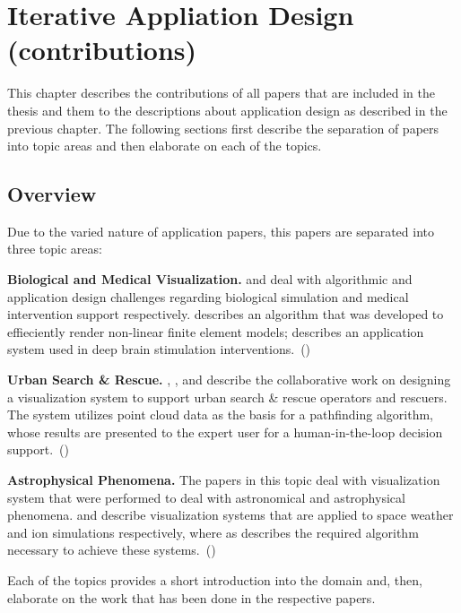 \chapter{Iterative Appliation Design (contributions)}
\label{contributions}

This chapter describes the contributions of all papers that are included in the thesis and them to the descriptions about application design as described in the previous chapter. The following sections first describe the separation of papers into topic areas and then elaborate on each of the topics.

\section{Overview}
\label{contributions:overview}
Due to the varied nature of application papers, this papers are separated into three topic areas:

\textbf{Biological and Medical Visualization. }  and  deal with algorithmic and application design challenges regarding biological simulation and medical intervention support respectively.  describes an algorithm that was developed to effieciently render non-linear finite element models;  describes an application system used in deep brain stimulation interventions.~()

\textbf{Urban Search \& Rescue. } , , and  describe the collaborative work on designing a visualization system to support urban search \& rescue operators and rescuers. The system utilizes  point cloud data as the basis for a pathfinding algorithm, whose results are presented to the expert user for a human-in-the-loop decision support.~()

\textbf{Astrophysical Phenomena. } The papers in this topic deal with visualization system that were performed to deal with astronomical and astrophysical phenomena.  and  describe visualization systems that are applied to space weather and ion simulations respectively, where as  describes the required algorithm necessary to achieve these systems.~()

Each of the topics provides a short introduction into the domain and, then, elaborate on the work that has been done in the respective papers.


